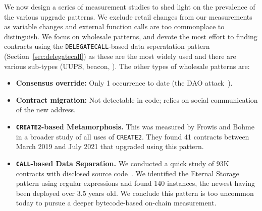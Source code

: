 We now design a series of measurement studies to shed light on the prevalence of the various upgrade patterns. We exclude retail changes from our measurements as variable changes and external function calls are too commonplace to distinguish. We focus on wholesale patterns, and devote the most effort to finding contracts using the \texttt{DELEGATECALL}-based data seperatation pattern (Section~\ref{sec:delegatecall}) as these are the most widely used and there are various sub-types (UUPS, beacon, \etc). The other types of wholesale patterns are: 
\begin{itemize}
\item \textbf{Consensus override:} Only 1 occurrence to date (the DAO attack~\cite{}).
\item \textbf{Contract migration:} Not detectable in code; relies on social communication of the new address.
\item \textbf{\texttt{CREATE2}-based Metamorphosis.} This was measured by Frowis and Bohme~\cite{} in a broader study of all uses of \texttt{CREATE2}. They found 41 contracts between March 2019 and July 2021 that upgraded using this pattern.
\item \textbf{\texttt{CALL}-based Data Separation.} We conducted a quick study of 93K contracts with disclosed source code~\cite{smart_contract_sanctuary}. We identified the Eternal Storage pattern using regular expressions and found 140 instances, the newest having been deployed over 3.5 years old. We conclude this pattern is too uncommon today to pursue a deeper bytecode-based on-chain measurement.  
\end{itemize}




